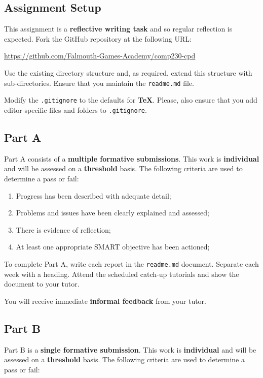 \documentclass{../fal_assignment}
\begin{document}
\subsection*{Assignment Setup}

This assignment is a \textbf{reflective writing task} and so regular reflection is expected. Fork the GitHub repository at the following URL:

\indent \url{https://github.com/Falmouth-Games-Academy/comp230-cpd}

Use the existing directory structure and, as required, extend this structure with sub-directories. Ensure that you maintain the \texttt{readme.md} file. 

Modify the \texttt{.gitignore} to the defaults for \textbf{TeX}. Please, also ensure that you add editor-specific files and folders to \texttt{.gitignore}. 

\subsection*{Part A}

Part A consists of a \textbf{multiple formative submissions}. This work is \textbf{individual} and will be assessed on a \textbf{threshold} basis. The following criteria are used to determine a pass or fail:

\begin{enumerate}[label=(\alph*)]
	\item Progress has been described with adequate detail;
	\item Problems and issues have been clearly explained and assessed;
	\item There is evidence of reflection;
	\item At least one appropriate SMART objective has been actioned;
\end{enumerate}

To complete Part A, write each report in the \texttt{readme.md} document. Separate each week with a heading. Attend the scheduled catch-up tutorials and show the document to your tutor. 

You will receive immediate \textbf{informal feedback} from your tutor.

\subsection*{Part B}

Part B is a \textbf{single formative submission}. This work is \textbf{individual} and will be assessed on a \textbf{threshold} basis. The following criteria are used to determine a pass or fail:
\end{document}
